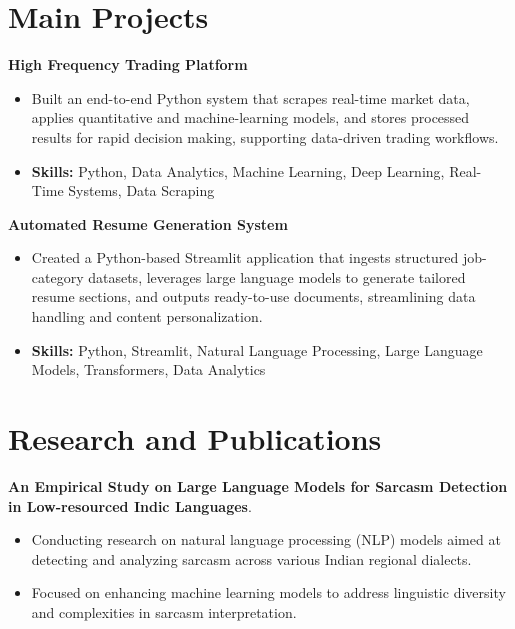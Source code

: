 \documentclass[a4paper,11pt]{article}
\begin{document}
\section{\textbf{Main Projects}}

\vspace{1mm}
  \textbf{High Frequency Trading Platform  }
\vspace{-1.5mm} %
\begin{itemize}
  \item Built an end-to-end Python system that scrapes real-time market data, applies quantitative and machine-learning models, and stores processed results for rapid decision making, supporting data-driven trading workflows.
\vspace{-3mm}
  \item \textbf{Skills:} Python, Data Analytics, Machine Learning, Deep Learning, Real-Time Systems, Data Scraping
\end{itemize}


\vspace{1mm}
   \textbf{Automated Resume Generation System }
\vspace{-1.5mm} %
\begin{itemize}
  \item Created a Python-based Streamlit application that ingests structured job-category datasets, leverages large language models to generate tailored resume sections, and outputs ready-to-use documents, streamlining data handling and content personalization.
\vspace{-3mm}
  \item \textbf{Skills:} Python, Streamlit, Natural Language Processing, Large Language Models, Transformers, Data Analytics
\end{itemize}



\section{\textbf{Research and Publications} \hfill }
\vspace{1mm}
  \textbf{An Empirical Study on Large Language Models for Sarcasm Detection in Low-resourced Indic Languages}.
\vspace{-1mm} %
\begin{itemize}
  \item Conducting research on natural language processing (NLP) models aimed at detecting and analyzing sarcasm across various Indian regional dialects.
\vspace{-3mm}
  \item Focused on enhancing machine learning models to address linguistic diversity and complexities in sarcasm interpretation.
\end{itemize}
\end{document}
